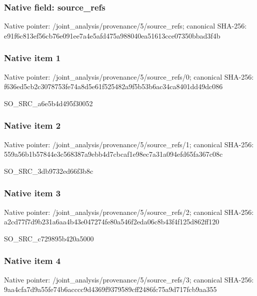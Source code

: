 \documentclass[10pt,a4paper]{article}
\begin{document}
\subsubsection{Native field: source\_\allowbreak{}refs}
Native pointer: /joint\_\allowbreak{}analysis/provenance/5/source\_\allowbreak{}refs; canonical SHA-256: e91f6c813ef56cb76e091ee7a4e5afd475a988040ea51613cce07350bbad3f4b

\subsubsection{Native item 1}
Native pointer: /joint\_\allowbreak{}analysis/provenance/5/source\_\allowbreak{}refs/0; canonical SHA-256: f636ed5cb2c3078753fe74a8d5e61f525482a9f5b53b6ac34ca8401dd49dc086

\begingroup\raggedright\sloppy SO\_\allowbreak{}SRC\_\allowbreak{}a6e5b4d495f30052\par\endgroup

\subsubsection{Native item 2}
Native pointer: /joint\_\allowbreak{}analysis/provenance/5/source\_\allowbreak{}refs/1; canonical SHA-256: 559a56b1b57844e3c568387a9ebb4d7cbcaf1e98ec7a31a094efd65fa367c08c

\begingroup\raggedright\sloppy SO\_\allowbreak{}SRC\_\allowbreak{}3db9732ed66f3b8c\par\endgroup

\subsubsection{Native item 3}
Native pointer: /joint\_\allowbreak{}analysis/provenance/5/source\_\allowbreak{}refs/2; canonical SHA-256: a2cd77f7d9b231a6aa4b43e047274fe80a546f2eda06c8b43f4f125d862ff120

\begingroup\raggedright\sloppy SO\_\allowbreak{}SRC\_\allowbreak{}c729895b420a5000\par\endgroup

\subsubsection{Native item 4}
Native pointer: /joint\_\allowbreak{}analysis/provenance/5/source\_\allowbreak{}refs/3; canonical SHA-256: 9aa4cfa7d9a55fe74b6acccc9d4369f9379589cff2486fc75a9d717fcb9aa355
\end{document}
